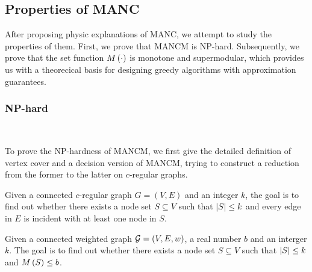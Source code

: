 \documentclass[sigconf]{acmart}
\begin{document}

\subsection{Properties of MANC}

After proposing physic explanations of MANC, we attempt to study the properties of them. First, we prove that MANCM is NP-hard.
Subsequently, we prove that the set function \(M\left(\cdot\right)\) is monotone and supermodular, which provides us with a theorecical basis for designing greedy algorithms with approximation guarantees.

\subsubsection{NP-hard}

\

To prove the NP-hardness of MANCM, we first give the detailed definition of vertex cover and a decision version of MANCM, trying to construct a reduction from the former to the latter on \(c\)-regular graphs.

\begin{problem}
Given a connected \(c\)-regular graph \(G=(V,E)\) and an integer \(k\), the goal is to find out whether there exists a node set \(S\subseteq V\) such that \(\left|S \right|\le k\) and every edge in \(E\) is incident with at least one node in \(S\).
\end{problem}

\begin{problem}
Given a connected weighted graph \(\mathcal{G}=(V,E,w)\), a real number \(b\) and an interger \(k\).
The goal is to find out whether there exists a node set \(S\subseteq V\) such that \(\left|S \right|\le k\) and \(M\left(S\right)\le b\).
\end{problem}
\end{document}
